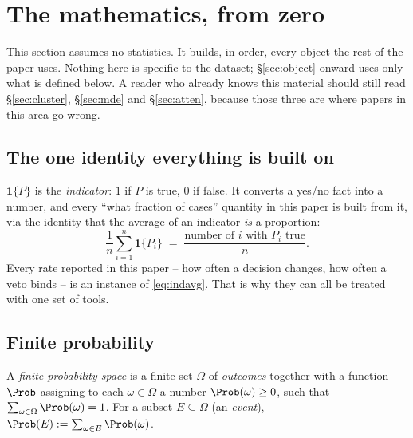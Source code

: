 \section{The mathematics, from zero}
\label{sec:math}

This section assumes no statistics. It builds, in order, every object the rest of
the paper uses. Nothing here is specific to the dataset; §\ref{sec:object} onward
uses only what is defined below. A reader who already knows this material should
still read §\ref{sec:cluster}, §\ref{sec:mde} and §\ref{sec:atten}, because those
three are where papers in this area go wrong.

\subsection{The one identity everything is built on}

$\mathbf{1}\{P\}$ is the \emph{indicator}: $1$ if $P$ is true, $0$ if false. It
converts a yes/no fact into a number, and every ``what fraction of cases''
quantity in this paper is built from it, via the identity that the average of an
indicator \emph{is} a proportion:
\begin{equation}
\frac{1}{n}\sum_{i=1}^{n}\mathbf{1}\{P_i\}
  \;=\; \frac{\text{number of } i \text{ with } P_i \text{ true}}{n}.
\label{eq:indavg}
\end{equation}
Every rate reported in this paper -- how often a decision changes, how often a
veto binds -- is an instance of \cref{eq:indavg}. That is why they can all be
treated with one set of tools.

\subsection{Finite probability}

\begin{definition}
A \emph{finite probability space} is a finite set $\Omega$ of \emph{outcomes}
together with a function $\Prob$ assigning to each $\omega \in \Omega$ a number
$\Prob(\omega) \ge 0$, such that $\sum_{\omega \in \Omega} \Prob(\omega) = 1$.
For a subset $E \subseteq \Omega$ (an \emph{event}),
$\Prob(E) := \sum_{\omega \in E}\Prob(\omega)$.
\end{definition}

